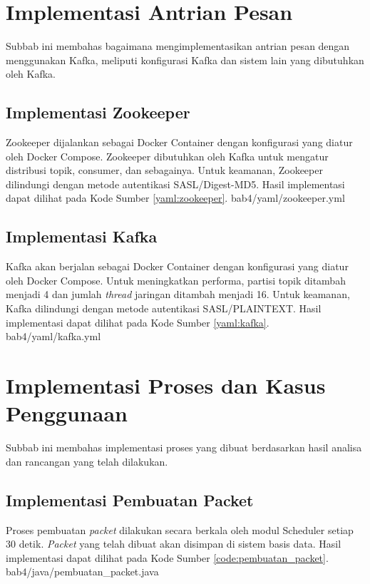 \section{Implementasi Antrian Pesan}
\par Subbab ini membahas bagaimana mengimplementasikan antrian pesan dengan menggunakan Kafka, meliputi konfigurasi Kafka dan sistem lain yang dibutuhkan oleh Kafka.

\subsection{Implementasi Zookeeper}
\par Zookeeper dijalankan sebagai Docker Container dengan konfigurasi yang diatur oleh Docker Compose. Zookeeper dibutuhkan oleh Kafka untuk mengatur distribusi topik, consumer, dan sebagainya. Untuk keamanan, Zookeeper dilindungi dengan metode autentikasi SASL/Digest-MD5. Hasil implementasi dapat dilihat pada Kode Sumber \ref{yaml:zookeeper}.
 {bab4/yaml/zookeeper.yml}

\subsection{Implementasi Kafka}
\par Kafka akan berjalan sebagai Docker Container dengan konfigurasi yang diatur oleh Docker Compose. Untuk meningkatkan performa, partisi topik ditambah menjadi 4 dan jumlah \textit{thread} jaringan ditambah menjadi 16. Untuk keamanan, Kafka dilindungi dengan metode autentikasi SASL/PLAINTEXT. Hasil implementasi dapat dilihat pada Kode Sumber \ref{yaml:kafka}.
 {bab4/yaml/kafka.yml}

\section{Implementasi Proses dan Kasus Penggunaan}
\par Subbab ini membahas implementasi proses yang dibuat berdasarkan hasil analisa dan rancangan yang telah dilakukan.

\subsection{Implementasi Pembuatan Packet}
\par Proses pembuatan \textit{packet} dilakukan secara berkala oleh modul Scheduler setiap 30 detik. \textit{Packet} yang telah dibuat akan disimpan di sistem basis data. Hasil implementasi dapat dilihat pada Kode Sumber \ref{code:pembuatan_packet}.
 {bab4/java/pembuatan_packet.java}

